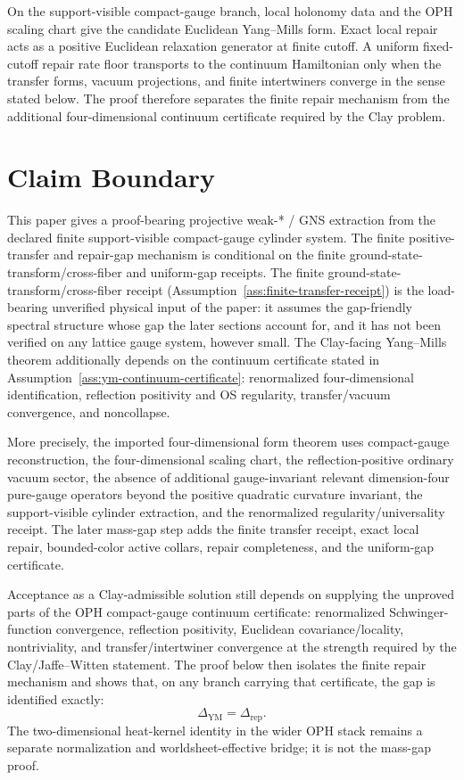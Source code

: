 \documentclass[11pt]{article}
\numberwithin{equation}{section}
\theoremstyle{remark}
\newcommand{\YM}{\mathrm{YM}}
\begin{document}
On the support-visible compact-gauge branch, local holonomy data and the OPH scaling chart give
the candidate Euclidean Yang--Mills form. Exact local repair acts as a positive Euclidean
relaxation generator at finite cutoff. A uniform fixed-cutoff repair rate floor transports to the
continuum Hamiltonian only when the transfer forms, vacuum projections, and finite intertwiners
converge in the sense stated below. The proof therefore separates the finite repair mechanism from
the additional four-dimensional continuum certificate required by the Clay problem.

\section{Claim Boundary}

This paper gives a proof-bearing projective weak-* / GNS extraction from the declared finite
support-visible compact-gauge cylinder system. The finite positive-transfer and repair-gap
mechanism is conditional on the finite ground-state-transform/cross-fiber and uniform-gap receipts.
The finite ground-state-transform/cross-fiber receipt
(Assumption~\ref{ass:finite-transfer-receipt}) is the load-bearing unverified physical input of
the paper: it assumes the gap-friendly spectral structure whose gap the later sections account
for, and it has not been verified on any lattice gauge system, however small.
The Clay-facing Yang--Mills theorem additionally depends on the continuum certificate stated in
Assumption~\ref{ass:ym-continuum-certificate}: renormalized four-dimensional identification,
reflection positivity and OS regularity, transfer/vacuum convergence, and noncollapse.

More precisely, the imported four-dimensional form theorem uses compact-gauge reconstruction, the
four-dimensional scaling chart, the reflection-positive ordinary vacuum sector, the absence of
additional gauge-invariant relevant dimension-four pure-gauge operators beyond the positive
quadratic curvature invariant, the support-visible cylinder extraction, and the renormalized
regularity/universality receipt. The later mass-gap step adds the finite transfer receipt, exact
local repair, bounded-color active collars, repair completeness, and the uniform-gap certificate.

Acceptance as a Clay-admissible solution still depends on supplying the unproved parts of the OPH
compact-gauge continuum certificate: renormalized Schwinger-function convergence, reflection
positivity, Euclidean covariance/locality, nontriviality, and transfer/intertwiner convergence at
the strength required by the Clay/Jaffe--Witten statement. The proof below then isolates the
finite repair mechanism and shows that, on any branch carrying that certificate, the gap is
identified exactly:
\[
\Delta_{\YM}=\Delta_{\mathrm{rep}}.
\]
The two-dimensional heat-kernel identity in the wider OPH stack remains a separate normalization
and worldsheet-effective bridge; it is not the mass-gap proof.
\end{document}
